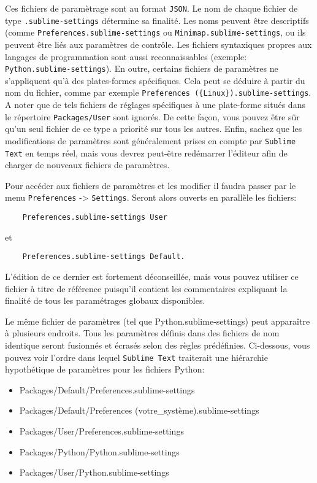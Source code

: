 \documentclass[french,a4paper]{article}
\begin{document}
Ces fichiers de paramètrage sont au format \texttt{JSON}. Le nom de chaque 
 fichier de type \texttt{.sublime-settings} détermine sa finalité. Les noms 
 peuvent être descriptifs (comme \texttt{Preferences.sublime-settings} ou 
 \texttt{Minimap.sublime-settings}, ou ils peuvent être liés aux paramètres de
 contrôle. Les fichiers syntaxiques propres aux langages de programmation sont
 aussi reconnaissables (exemple: \texttt{Python.sublime-settings}). En outre, 
 certains fichiers de paramètres ne s'appliquent qu'à des plates-formes 
 spécifiques. Cela peut se déduire à partir du nom du fichier, comme par 
 exemple \texttt{Preferences (\{Linux\}).sublime-settings}. A noter que de tels
 fichiers de réglages spécifiques à une plate-forme situés dans le répertoire
 \texttt{Packages/User} sont ignorés. De cette façon, vous pouvez être sûr 
 qu'un seul fichier de ce type a priorité sur tous les autres. Enfin, sachez
 que les modifications de paramètres sont généralement prises en compte par 
 \texttt{Sublime Text} en temps réel, mais vous devrez peut-être redémarrer 
 l'éditeur afin de charger de nouveaux fichiers de paramètres.
\medskip

Pour accéder aux fichiers de paramètres et les modifier il faudra passer par le
 menu \texttt{Preferences} -> \texttt{Settings}. Seront alors ouverts en 
 parallèle les fichiers:
\begin{center}
\begin{verbatim}
    Preferences.sublime-settings User
\end{verbatim}
\medskip
et
\begin{verbatim}
    Preferences.sublime-settings Default.
\end{verbatim}
\end{center}
L'édition de ce dernier est fortement déconseillée, mais vous pouvez utiliser 
 ce fichier à titre de référence puisqu'il contient les commentaires expliquant
 la finalité de tous les paramétrages globaux disponibles.
\medskip

Le même fichier de paramètres (tel que Python.sublime-settings) peut
apparaître à plusieurs endroits. Tous les paramètres définis dans des fichiers
de nom identique seront fusionnés et écrasés selon des règles prédéfinies. 
Ci-dessous, vous pouvez voir l'ordre dans lequel \texttt{Sublime Text} 
traiterait une hiérarchie hypothétique de paramètres pour les fichiers Python:
\begin{itemize}
    \item Packages/Default/Preferences.sublime-settings
    \item Packages/Default/Preferences (votre\_système).sublime-settings
    \item Packages/User/Preferences.sublime-settings
    \item Packages/Python/Python.sublime-settings
    \item Packages/User/Python.sublime-settings 
\end{itemize}
\bigskip
\end{document}
